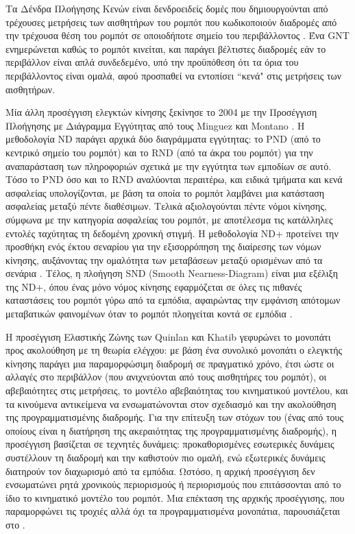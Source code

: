 Τα Δένδρα Πλοήγησης Κενών είναι δενδροειδείς δομές που δημιουργούνται από
τρέχουσες μετρήσεις των αισθητήρων του ρομπότ που κωδικοποιούν διαδρομές από
την τρέχουσα θέση του ρομπότ σε οποιοδήποτε σημείο του περιβάλλοντος
\cite{Tovar2005}. Ένα GNT ενημερώνεται καθώς το ρομπότ κινείται, και παράγει
βέλτιστες διαδρομές εάν το περιβάλλον είναι απλά συνδεδεμένο, υπό την
προϋπόθεση ότι τα όρια του περιβάλλοντος είναι ομαλά, αφού προσπαθεί να
εντοπίσει ``κενά" στις μετρήσεις των αισθητήρων.

Μία άλλη προσέγγιση ελεγκτών κίνησης ξεκίνησε το 2004 με την Προσέγγιση
Πλοήγησης με Διάγραμμα Εγγύτητας από τους Minguez και Montano \cite{Mingueza}.
Η μεθοδολογία ND παράγει αρχικά δύο διαγράμματα εγγύτητας: το PND (από το
κεντρικό σημείο του ρομπότ) και το RND (από τα άκρα του ρομπότ) για την
αναπαράσταση των πληροφοριών σχετικά με την εγγύτητα των εμποδίων σε αυτό. Τόσο
το PND όσο και το RND αναλύονται περαιτέρω, και ειδικά τμήματα και κενά
ασφαλείας υπολογίζονται, με βάση τα οποία το ρομπότ λαμβάνει μια κατάσταση
ασφαλείας μεταξύ πέντε διαθέσιμων. Τελικά αξιολογούνται πέντε νόμοι κίνησης,
σύμφωνα με την κατηγορία ασφαλείας του ρομπότ, με αποτέλεσμα τις κατάλληλες
εντολές ταχύτητας τη δεδομένη χρονική στιγμή. Η μεθοδολογία ND+ προτείνει την
προσθήκη ενός έκτου σεναρίου για την εξισορρόπηση της διαίρεσης των νόμων
κίνησης, αυξάνοντας την ομαλότητα των μεταβάσεων μεταξύ ορισμένων από τα
σενάρια \cite{Minguez2004a}. Τέλος, η πλοήγηση SND (Smooth Nearness-Diagram)
είναι μια εξέλιξη της ND+, όπου ένας μόνο νόμος κίνησης εφαρμόζεται σε όλες τις
πιθανές καταστάσεις του ρομπότ γύρω από τα εμπόδια, αφαιρώντας την εμφάνιση
απότομων μεταβατικών φαινομένων όταν το ρομπότ πλοηγείται κοντά σε εμπόδια
\cite{Durham2008}.

Η προσέγγιση Ελαστικής Ζώνης των Quinlan και Khatib \cite{Quinlan} γεφυρώνει το
μονοπάτι προς ακολούθηση με τη θεωρία ελέγχου: με βάση ένα συνολικό μονοπάτι ο
ελεγκτής κίνησης παράγει μια παραμορφώσιμη διαδρομή σε πραγματικό χρόνο, έτσι
ώστε οι αλλαγές στο περιβάλλον (που ανιχνεύονται από τους αισθητήρες του
ρομπότ), οι αβεβαιότητες στις μετρήσεις, το μοντέλο αβεβαιότητας του
κινηματικού μοντέλου, και τα κινούμενα αντικείμενα να ενσωματώνονται στον
σχεδιασμό και την ακολούθηση της προγραμματισμένης διαδρομής. Για την επίτευξη
των στόχων του (ένας από τους οποίους είναι η διατήρηση της ακεραιότητας της
προγραμματισμένης διαδρομής), η προσέγγιση βασίζεται σε τεχνητές δυνάμεις:
προκαθορισμένες εσωτερικές δυνάμεις συστέλλουν τη διαδρομή και την καθιστούν
πιο ομαλή, ενώ εξωτερικές δυνάμεις διατηρούν τον διαχωρισμό από τα εμπόδια.
Ωστόσο, η αρχική προσέγγιση δεν ενσωματώνει ρητά χρονικούς περιορισμούς ή
περιορισμούς που επιτάσσονται από το ίδιο το κινηματικό μοντέλο του ρομπότ. Μια
επέκταση της αρχικής προσέγγισης, που παραμορφώνει τις τροχιές αλλά όχι τα
προγραμματισμένα μονοπάτια, παρουσιάζεται στο \cite{Kurniawati2007}.

